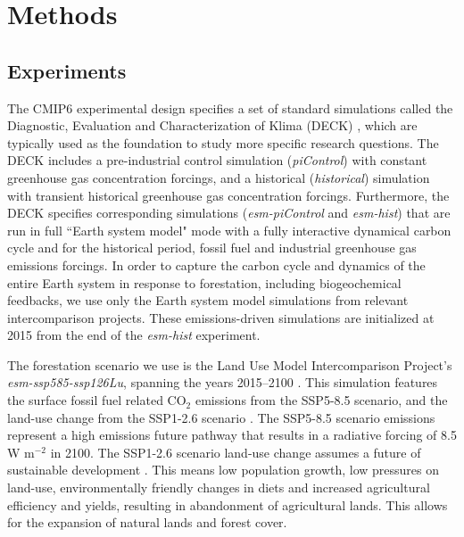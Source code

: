 \documentclass[]{article}
\begin{document}
\section{Methods}

\subsection{Experiments}

The CMIP6 experimental design specifies a set of standard simulations called the Diagnostic, Evaluation and Characterization of Klima (DECK) \parencite{eyring_overview_2016}, which are typically used as the foundation to study more specific research questions.
The DECK includes a pre-industrial control simulation (\textit{piControl}) with constant greenhouse gas concentration forcings, and a historical (\textit{historical}) simulation with transient historical greenhouse gas concentration forcings.
Furthermore, the DECK specifies corresponding simulations (\textit{esm-piControl} and \textit{esm-hist}) that are run in full ``Earth system model" mode with a fully interactive dynamical carbon cycle and for the historical period, fossil fuel and industrial greenhouse gas emissions forcings.
In order to capture the carbon cycle and dynamics of the entire Earth system in response to forestation, including biogeochemical feedbacks, we use only the Earth system model simulations from relevant intercomparison projects. These emissions-driven simulations are initialized at 2015 from the end of the \textit{esm-hist} experiment.

The forestation scenario we use is the Land Use Model Intercomparison Project's \textit{esm-ssp585-ssp126Lu}, spanning the years 2015--2100 \parencite{lawrence_land_2016}.
This simulation features the surface fossil fuel related CO$_{2}$ emissions from the SSP5-8.5 scenario, and the land-use change from the SSP1-2.6 scenario \parencite{oneill_scenario_2016}.
The SSP5-8.5 scenario emissions represent a high emissions future pathway that results in a radiative forcing of 8.5 W m$^{-2}$ in 2100.
The SSP1-2.6 scenario land-use change assumes a future of sustainable development \parencite{van_vuuren_energy_2017}.
This means low population growth, low pressures on land-use, environmentally friendly changes in diets and increased agricultural efficiency and yields, resulting in abandonment of agricultural lands.
This allows for the expansion of natural lands and forest cover.
\end{document}
